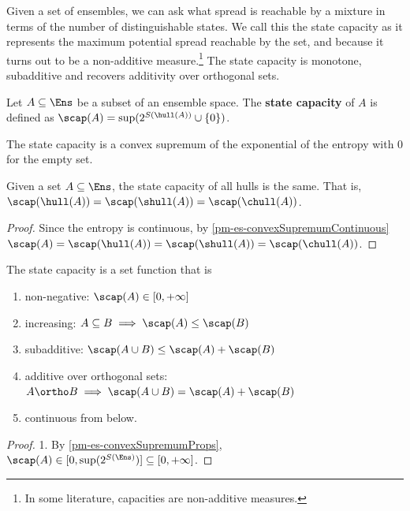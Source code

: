 \begin{mathSection}
\end{mathSection}

Given a set of ensembles, we can ask what spread is reachable by a mixture in terms of the number of distinguishable states. We call this the state capacity as it represents the maximum potential spread reachable by the set, and because it turns out to be a non-additive measure.\footnote{In some literature, capacities are non-additive measures.} The state capacity is monotone, subadditive and recovers additivity over orthogonal sets.

\begin{mathSection}
\begin{defn}
	Let $A \subseteq \Ens$ be a subset of an ensemble space. The \textbf{state capacity} of $A$ is defined as $\scap(A) = \sup(2^{S(\hull(A))}\cup\{0\})$.
\end{defn}

\begin{coro}
	The state capacity is a convex supremum of the exponential of the entropy with $0$ for the empty set.
\end{coro}

\begin{coro}
	Given a set $A \subseteq \Ens$, the state capacity of all hulls is the same. That is, $\scap(\hull(A)) = \scap(\shull(A)) = \scap(\chull(A))$.
\end{coro}

\begin{proof}
	Since the entropy is continuous, by \ref{pm-es-convexSupremumContinuous} $\scap(A) = \scap(\hull(A)) = \scap(\shull(A)) = \scap(\chull(A))$.
\end{proof}

\begin{prop}
	The state capacity is a set function that is
	\begin{enumerate}
		\item non-negative: $\scap(A) \in [0, +\infty]$
		\item increasing: $A \subseteq B \implies \scap(A) \leq \scap(B)$
		\item subadditive: $\scap(A \cup B) \leq \scap(A) + \scap(B)$
		\item additive over orthogonal sets: $A \ortho B \implies \scap(A \cup B) = \scap(A) + \scap(B)$ 
		\item continuous from below.
	\end{enumerate}
\end{prop}

\begin{proof}
	1. By \ref{pm-es-convexSupremumProps}, $\scap(A) \in [0, \sup(2^{S(\Ens)})] \subseteq [0,+\infty]$. 
	

\end{proof}
\end{mathSection}
